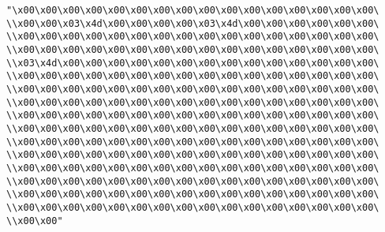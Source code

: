 \verb|"\x00\x00\x00\x00\x00\x00\x00\x00\x00\x00\x00\x00\x00\x00\x00\x00\|\newline
\verb|\\x00\x00\x03\x4d\x00\x00\x00\x00\x03\x4d\x00\x00\x00\x00\x00\x00\|\newline
\verb|\\x00\x00\x00\x00\x00\x00\x00\x00\x00\x00\x00\x00\x00\x00\x00\x00\|\newline
\verb|\\x00\x00\x00\x00\x00\x00\x00\x00\x00\x00\x00\x00\x00\x00\x00\x00\|\newline
\verb|\\x03\x4d\x00\x00\x00\x00\x00\x00\x00\x00\x00\x00\x00\x00\x00\x00\|\newline
\verb|\\x00\x00\x00\x00\x00\x00\x00\x00\x00\x00\x00\x00\x00\x00\x00\x00\|\newline
\verb|\\x00\x00\x00\x00\x00\x00\x00\x00\x00\x00\x00\x00\x00\x00\x00\x00\|\newline
\verb|\\x00\x00\x00\x00\x00\x00\x00\x00\x00\x00\x00\x00\x00\x00\x00\x00\|\newline
\verb|\\x00\x00\x00\x00\x00\x00\x00\x00\x00\x00\x00\x00\x00\x00\x00\x00\|\newline
\verb|\\x00\x00\x00\x00\x00\x00\x00\x00\x00\x00\x00\x00\x00\x00\x00\x00\|\newline
\verb|\\x00\x00\x00\x00\x00\x00\x00\x00\x00\x00\x00\x00\x00\x00\x00\x00\|\newline
\verb|\\x00\x00\x00\x00\x00\x00\x00\x00\x00\x00\x00\x00\x00\x00\x00\x00\|\newline
\verb|\\x00\x00\x00\x00\x00\x00\x00\x00\x00\x00\x00\x00\x00\x00\x00\x00\|\newline
\verb|\\x00\x00\x00\x00\x00\x00\x00\x00\x00\x00\x00\x00\x00\x00\x00\x00\|\newline
\verb|\\x00\x00\x00\x00\x00\x00\x00\x00\x00\x00\x00\x00\x00\x00\x00\x00\|\newline
\verb|\\x00\x00\x00\x00\x00\x00\x00\x00\x00\x00\x00\x00\x00\x00\x00\x00\|\newline
\verb|\\x00\x00"|\newline

